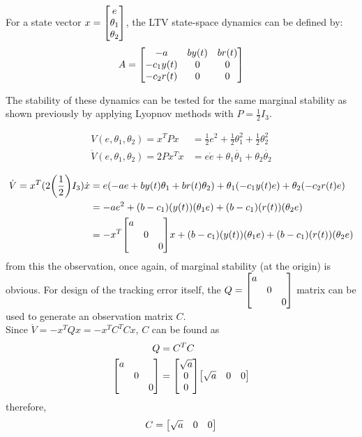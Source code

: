 \documentclass[letter]{article}
\begin{document}
For a state vector $x = \mqty[e \\ \theta_1 \\ \theta_2]$, the LTV state-space dynamics can be defined by:
\begin{equation}
	A = \mqty[-a & b y(t) & b r(t)\\
			  -c_1 y(t) & 0 &0\\
			  -c_2 r(t) & 0 &0]
\end{equation}

The stability of these dynamics can be tested for the same marginal stability as shown previously by applying Lyopnov methods with $P=\frac{1}{2} I_3$.

\begin{align}
	V(e, \theta_1, \theta_2) = x^T P x
	&= \frac{1}{2} e^2 + \frac{1}{2} \theta_1^2 + \frac{1}{2} \theta_2^2\\
	\dot{V}(e, \theta_1, \theta_2) = 2 P x^T \dot{x}
	&= e \dot{e} + \theta_1 \dot{\theta_1} + \theta_2 \dot{\theta_2}\\
\end{align}
\begin{align}
	\dot{V} = x^T (2 \qty(\frac{1}{2}) I_3)\dot{x}
	&= e \qty(-a e + b y(t) \theta_1 + b r(t) \theta_2)
	+ \theta_1 (- c_1 y(t) e)
	+ \theta_2 (- c_2 r(t) e)\\
	&= -a e^2 + (b-c_1) (y(t)) (\theta_1 e) + (b - c_1) (r(t)) (\theta_2 e)\\
	&= - x^T \mqty[\dmat{a,0,0}] x + (b-c_1) (y(t)) (\theta_1 e) + (b - c_1) (r(t)) (\theta_2 e)\label{eq:v_dot_result}
\end{align}
from this the observation, once again, of marginal stability (at the origin) is obvious. For design of the tracking error itself, the $Q = \mqty[\dmat{a,0,0}]$ matrix can be used to generate an observation matrix $C$.\\

Since $\dot{V} = -x^T Q x = -x^T C^T C x$, $C$ can be found as
\begin{align}
	Q &= C^T C\\
	\mqty[\dmat{a,0,0}] &= \mqty[\sqrt{a}\\0\\0] \mqty[\sqrt{a}&0&0]
\end{align}
therefore,
\begin{equation}
	C = \mqty[\sqrt{a} & 0 & 0]
\end{equation}
\end{document}
